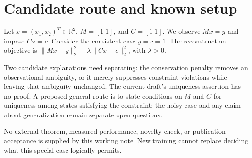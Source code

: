 \section{Candidate route and known setup}
Let $x=(x_1,x_2)^T\in\mathbb{R}^2$, $M=[1\;1]$, and $C=[1\;1]$.
We observe $Mx=y$ and impose $Cx=c$. Consider the consistent case $y=c=1$.
The reconstruction objective is $\|Mx-y\|_2^2+\lambda\|Cx-c\|_2^2$, with $\lambda>0$.

Two candidate explanations need separating: the conservation penalty removes an observational ambiguity, or it merely suppresses constraint violations while leaving that ambiguity unchanged.
The current draft's uniqueness assertion has no proof. A proposed general route is to state conditions on $M$ and $C$ for uniqueness among states satisfying the constraint; the noisy case and any claim about generalization remain separate open questions.

No external theorem, measured performance, novelty check, or publication acceptance is supplied by this working note. New training cannot replace deciding what this special case logically permits.
